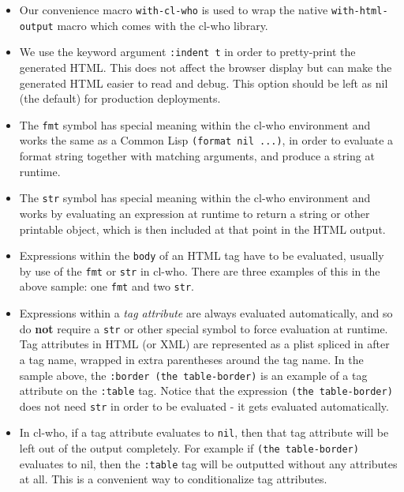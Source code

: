 \documentclass [11pt]{book}
\begin{document}
\begin{itemize}

\item Our convenience macro \texttt{with-cl-who} is used to wrap the native \texttt{with-html-output} macro which comes with the cl-who library.

\item We use the keyword argument \texttt{:indent t} in order to pretty-print the generated HTML. This does
     not affect the browser display but can make the generated HTML
     easier to read and debug. This option should be left as nil (the
     default) for production deployments.

\item The \texttt{fmt} symbol has special meaning
      within the cl-who environment and works the same as a Common
      Lisp \texttt{(format nil ...)}, in order to evaluate a format
      string together with matching arguments, and produce a string at
      runtime.

\item The \texttt{str} symbol has special meaning
      within the cl-who environment and works by evaluating an
      expression at runtime to return a string or other printable
      object, which is then included at that point in the HTML output.

\item Expressions within the \texttt{body} of an
      HTML tag have to be evaluated, usually by use of the \texttt{fmt} or \texttt{str} in cl-who.  There are three examples of this in the
      above sample: one \texttt{fmt} and two \texttt{str}.

\item Expressions within a \emph{tag attribute} are always evaluated automatically, and so do 
\textbf{not} require a \texttt{str} or other special symbol to force evaluation at
      runtime. Tag attributes in HTML (or XML) are represented as a
      plist spliced in after a tag name, wrapped in extra parentheses
      around the tag name. In the sample above, the \texttt{:border (the table-border)} is an example of a tag attribute on the \texttt{:table} tag. Notice that the expression \texttt{(the table-border)} does not need \texttt{str} in order to be evaluated - it gets evaluated automatically.

\item In cl-who, if a tag attribute evaluates to \texttt{nil}, then that tag attribute will be left out of the output
      completely. For example if \texttt{(the table-border)} evaluates to nil, then the \texttt{:table} tag will be outputted without any attributes at
      all. This is a convenient way to conditionalize tag
      attributes.


\end{itemize}
\end{document}
